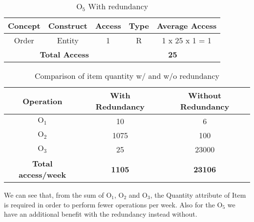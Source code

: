 \begin{table}[!h]\caption{	$ \textrm{O}_\textrm{5} $ With redundancy }
	\begin{center}
		\begin{tabular}{| c | c | c | c | c |}
			\hline
			\textbf{Concept} & \textbf{Construct} & \textbf{Access} & \textbf{Type} & \textbf{Average Access} \\ \hline
			Order & Entity & 1 & R & 1 x 25 x 1 = 1 \\ \hline
			\multicolumn{3}{|c|}{\textbf{Total Access}} & \multicolumn{2}{|c|}{\textbf{25}} \\ \hline
		\end{tabular}
	\end{center}
\end{table}
\begin{table}[!h]\caption{ Comparison of item quantity w/ and w/o redundancy }
	\begin{center}
		\begin{tabular}{ | c | c | c | }
			\hline
			\textbf{Operation} & \textbf{With Redundancy} & \textbf{Without Redundancy} \\ \hline
			$ \textrm{O}_\textrm{1} $ & 10 & 6\\ \hline
			$ \textrm{O}_\textrm{2} $ & 1075 & 100 \\ \hline
			$ \textrm{O}_\textrm{3} $ & 25 & 23000 \\\hline
			\textbf{Total access/week } & 	\textbf{1105} &	\textbf{23106} \\\hline
		\end{tabular}
	\end{center}
\end{table}

We can see that, from the sum of $ \textrm{O}_\textrm{1}$, $ \textrm{O}_\textrm{2}$ and $ \textrm{O}_\textrm{3}$, the Quantity attribute of Item is required in order to perform fewer operations per week. Also for the $ \textrm{O}_\textrm{5}$ we have an additional benefit with the redundancy instead without.